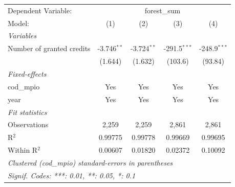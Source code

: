 
\begingroup
\centering
\begin{tabular}{lcccc}
   \tabularnewline \midrule \midrule
   Dependent Variable: & \multicolumn{4}{c}{forest\_sum}\\
   Model:                    & (1)           & (2)           & (3)            & (4)\\  
   \midrule
   \emph{Variables}\\
   Number of granted credits & -3.746$^{**}$ & -3.724$^{**}$ & -291.5$^{***}$ & -248.9$^{***}$\\   
                             & (1.644)       & (1.632)       & (103.6)        & (93.84)\\   
   \midrule
   \emph{Fixed-effects}\\
   cod\_mpio                 & Yes           & Yes           & Yes            & Yes\\  
   year                      & Yes           & Yes           & Yes            & Yes\\  
   \midrule
   \emph{Fit statistics}\\
   Observations              & 2,259         & 2,259         & 2,861          & 2,861\\  
   R$^2$                     & 0.99775       & 0.99778       & 0.99669        & 0.99695\\  
   Within R$^2$              & 0.00607       & 0.01820       & 0.02372        & 0.10092\\  
   \midrule \midrule
   \multicolumn{5}{l}{\emph{Clustered (cod\_mpio) standard-errors in parentheses}}\\
   \multicolumn{5}{l}{\emph{Signif. Codes: ***: 0.01, **: 0.05, *: 0.1}}\\
\end{tabular}
\par\endgroup


